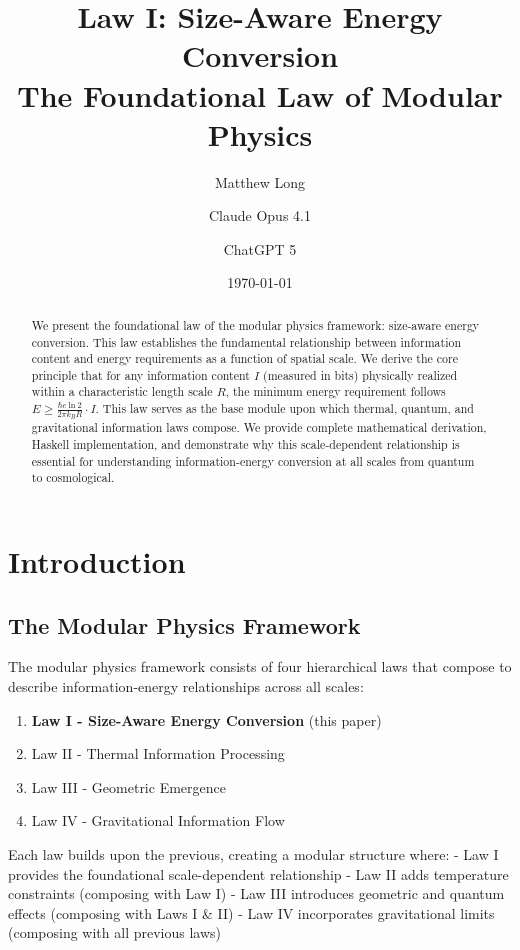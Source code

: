 \documentclass[11pt,a4paper]{article}
\title{Law I: Size-Aware Energy Conversion\\[0.5em]
\large The Foundational Law of Modular Physics}
\author[1]{Matthew Long}
\author[2]{Claude Opus 4.1}
\author[3]{ChatGPT 5}
\affil[1]{YonedaAI}
\affil[2]{Anthropic}
\affil[3]{OpenAI}
\date{\today}
\theoremstyle{definition}
\begin{document}
\maketitle

\begin{abstract}
We present the foundational law of the modular physics framework: size-aware energy conversion. This law establishes the fundamental relationship between information content and energy requirements as a function of spatial scale. We derive the core principle that for any information content $I$ (measured in bits) physically realized within a characteristic length scale $R$, the minimum energy requirement follows $E \geq \frac{\hbar c \ln 2}{2\pi k_B R} \cdot I$. This law serves as the base module upon which thermal, quantum, and gravitational information laws compose. We provide complete mathematical derivation, Haskell implementation, and demonstrate why this scale-dependent relationship is essential for understanding information-energy conversion at all scales from quantum to cosmological.
\end{abstract}

\tableofcontents

\section{Introduction}

\subsection{The Modular Physics Framework}

The modular physics framework consists of four hierarchical laws that compose to describe information-energy relationships across all scales:

\begin{enumerate}
\item \textbf{Law I - Size-Aware Energy Conversion} (this paper)
\item Law II - Thermal Information Processing
\item Law III - Geometric Emergence  
\item Law IV - Gravitational Information Flow
\end{enumerate}

Each law builds upon the previous, creating a modular structure where:
- Law I provides the foundational scale-dependent relationship
- Law II adds temperature constraints (composing with Law I)
- Law III introduces geometric and quantum effects (composing with Laws I \& II)
- Law IV incorporates gravitational limits (composing with all previous laws)
\end{document}
